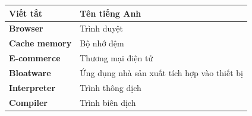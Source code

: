 \documentclass[../DoAn.tex]{subfiles}
\begin{document}
\begin{longtable}{l L{14cm}}
	\hline
   \textbf{Viết tắt}  & \textbf{Tên tiếng Anh} \\ \hline 
	\textbf{Browser} & Trình duyệt \\
	\textbf{Cache memory} & Bộ nhớ đệm \\
	\textbf{E-commerce} & Thương mại điện tử \\
	\textbf{Bloatware} & Ứng dụng nhà sản xuất tích hợp vào thiết bị \\
	\textbf{Interpreter}  &  Trình thông dịch \\
    \textbf{Compiler}  &  Trình biên dịch \\

    \hline
\end{longtable}
\end{document}
